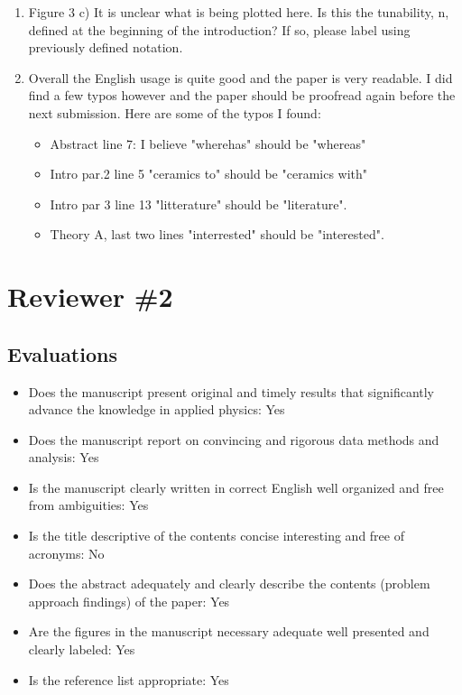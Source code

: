 \documentclass[%
 aip,
 amsmath,amssymb,
 reprint,%
]{revtex4-1}
\begin{document}
\begin{enumerate}
\item Figure 3 c) It is unclear what is being plotted here. Is this the tunability, n, defined at the
 beginning of the introduction? If so, please label using previously defined notation.

\item Overall the English usage is quite good and the paper is very readable. I did find a few typos
 however and the paper should be proofread again before the next submission. Here are some of the typos I
  found:
\begin{itemize}
  \item Abstract line 7: I believe "wherehas" should be "whereas"

  \item Intro par.2 line 5 "ceramics to" should be "ceramics with"

  \item Intro par 3 line 13 "litterature" should be "literature".

  \item Theory A, last two lines "interrested" should be "interested".
\end{itemize}

\end{enumerate}

\section{Reviewer \#2}
\subsection{Evaluations}

\begin{itemize}
  \item Does the manuscript present original and timely results that significantly advance the knowledge in
   applied physics: Yes
  \item Does the manuscript report on convincing and rigorous data methods and analysis: Yes
  \item Is the manuscript clearly written in correct English well organized and free from ambiguities: Yes
  \item Is the title descriptive of the contents concise interesting and free of acronyms: No
  \item Does the abstract adequately and clearly describe the contents (problem approach findings) of the
   paper: Yes
  \item Are the figures in the manuscript necessary adequate well presented and clearly labeled: Yes
  \item Is the reference list appropriate: Yes
\end{itemize}
\end{document}
